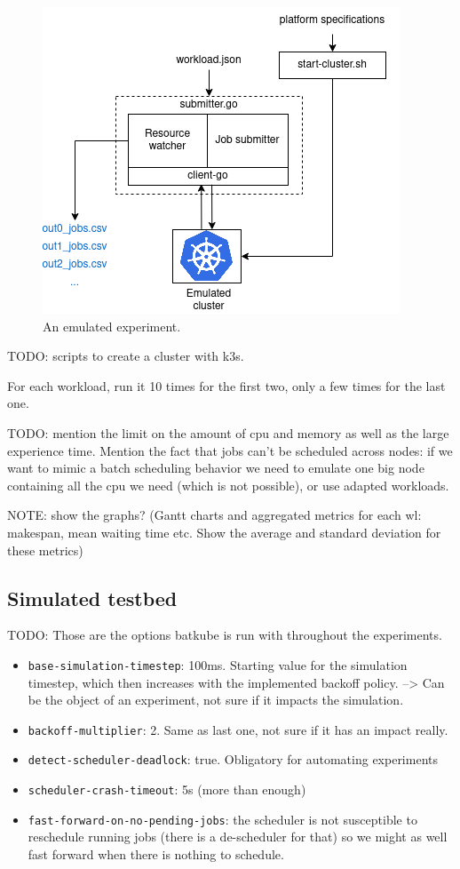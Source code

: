 \documentclass[12pt, a4paper]{memoir}
\begin{document}
\begin{figure}[h]
	\centering
	\includegraphics[scale=0.7]{./imgs/prot-k3s.png}
	\caption{An emulated experiment.}
	\label{fig:emulated-expe}
\end{figure}

TODO: scripts to create a cluster with k3s. 

For each workload, run it 10 times for the first two, only a few times for the
last one.

TODO: mention the limit on the amount of cpu and memory as well as the large
experience time. Mention the fact that jobs can't be scheduled across nodes:
if we want to mimic a batch scheduling behavior we need to emulate one big node
containing all the cpu we need (which is not possible), or use adapted workloads.

NOTE: show the graphs? (Gantt charts and aggregated metrics for each wl: makespan, mean waiting time etc. Show the average and standard deviation for these metrics)
\subsection{Simulated testbed}

TODO: Those are the options batkube is run with throughout the experiments.
\begin{itemize}
	\item \texttt{base-simulation-timestep}: 100ms. Starting value for the
		simulation timestep, which then increases with the implemented
		backoff policy. --> Can be the object of an experiment, not
		sure if it impacts the simulation.
	\item \texttt{backoff-multiplier}: 2. Same as last one, not sure if it
		has an impact really.
	\item \texttt{detect-scheduler-deadlock}: true. Obligatory for
		automating experiments
	\item \texttt{scheduler-crash-timeout}: 5s (more than enough)
	\item \texttt{fast-forward-on-no-pending-jobs}: the scheduler is not
		susceptible to reschedule running jobs (there is a de-scheduler
		for that) so we might as well fast forward when there is
		nothing to schedule.
\end{itemize}
\end{document}
